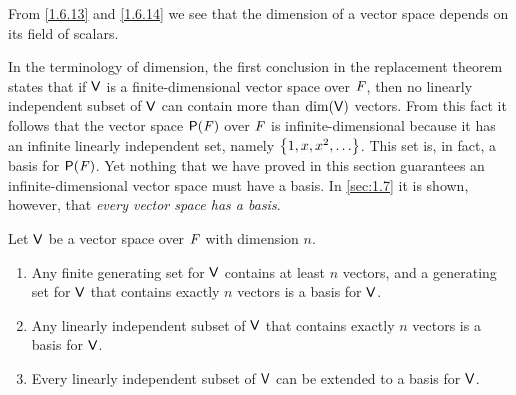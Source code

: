\begin{note}
  From \cref{1.6.13} and \cref{1.6.14} we see that the dimension of a vector space depends on its field of scalars.
\end{note}

\begin{note}
  In the terminology of dimension, the first conclusion in the replacement theorem states that if \(\mathsf{V}\) is a finite-dimensional vector space over \(\mathit{F}\), then no linearly independent subset of \(\mathsf{V}\) can contain more than \(\dim(\mathsf{V})\) vectors.
  From this fact it follows that the vector space \(\ps{\F}\) over \(\mathit{F}\) is infinite-dimensional because it has an infinite linearly independent set, namely \(\set{1, x, x^2, \dots}\).
  This set is, in fact, a basis for \(\ps{\F}\).
  Yet nothing that we have proved in this section guarantees an infinite-dimensional vector space must have a basis.
  In \cref{sec:1.7} it is shown, however, that \emph{every vector space has a basis}.
\end{note}

\begin{cor}\label{1.6.15}
  Let \(\mathsf{V}\) be a vector space over \(\mathit{F}\) with dimension \(n\).
  \begin{enumerate}
    \item Any finite generating set for \(\mathsf{V}\) contains at least \(n\) vectors, and a generating set for \(\mathsf{V}\) that contains exactly \(n\) vectors is a basis for \(\mathsf{V}\).
    \item Any linearly independent subset of \(\mathsf{V}\) that contains exactly \(n\) vectors is a basis for \(\mathsf{V}\).
    \item Every linearly independent subset of \(\mathsf{V}\) can be extended to a basis for \(\mathsf{V}\).
  \end{enumerate}
\end{cor}


